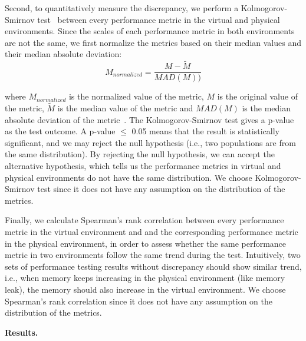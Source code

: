 Second, to quantitatively measure the discrepancy, we perform a Kolmogorov-Smirnov test~\cite{kstest} between every performance metric in the virtual and physical environments. Since the scales of each performance metric in both environments are not the same, we first normalize the metrics based on their median values and their median absolute deviation: 
\begin{equation}
	\label{equ:mad}
		M_{normalized}=\frac{M-\tilde{M}}{MAD(M))}		
\end{equation}
	
where $M_{normalized}$ is the normalized value of the metric, $M$ is the original value of the metric, $\tilde{M}$ is the median value of the metric and $MAD(M)$ is the median absolute deviation of the metric~\cite{walker1929studies}. The Kolmogorov-Smirnov test gives a p-value as the test outcome. A p-value $\leq$ 0.05 means that the result is statistically significant, and we may reject the null hypothesis (i.e., two populations are from the same distribution). By rejecting the null hypothesis, we can accept the alternative hypothesis, which tells us the performance metrics in virtual and physical environments do not have the same distribution. We choose Kolmogorov-Smirnov test since it does not have any assumption on the distribution of the metrics.

Finally, we calculate Spearman's rank correlation between every performance metric in the virtual environment and and the corresponding performance metric in the physical environment, in order to assess whether the same performance metric in two environments follow the same trend during the test. Intuitively, two sets of performance testing results without discrepancy should show similar trend, i.e., when memory keeps increasing in the physical environment (like memory leak), the memory should also increase in the virtual environment. We choose Spearman's rank correlation since it does not have any assumption on the distribution of the metrics. 

\noindent \textbf{Results.}


